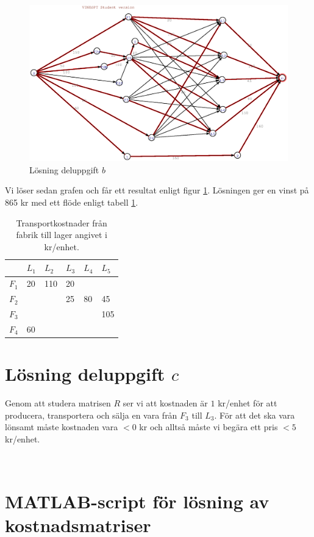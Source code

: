 \documentclass[titlepage, a4paper]{article}
\begin{document}
\begin{figure}[h!]
\centerline{\includegraphics[scale=0.65]{laborationsuppgift_13b_solved.ps}}
\caption{Lösning deluppgift $b$} \label{uppgiftb-graf}
\end{figure}

Vi löser sedan grafen och får ett resultat enligt figur \ref{uppgiftb-graf}. Lösningen ger en vinst på 865 kr med ett flöde enligt tabell \ref{uppgiftb-flode}.

\begin{table}[h!]
    \centering
    \begin{tabular}{ | l | l | l | l | l | l | }
        \hline
        {} & {$L_{1}$} & {$L_{2}$} & {$L_{3}$} & {$L_{4}$} & {$L_{5}$} \\\hline
        {$F_{1}$} & {20} & {110} & {20} & {} & {} \\\hline
        {$F_{2}$} & {} & {} & {25} & {80} & {45} \\\hline
        {$F_{3}$} & {} & {} & {} & {} & {105} \\\hline
        {$F_{4}$} & {60} & {} & {} & {} & {} \\\hline
    \end{tabular}
    \caption{Transportkostnader från fabrik till lager angivet i kr/enhet.} \label{uppgiftb-flode}
\end{table}

\section{Lösning deluppgift $c$}

Genom att studera matrisen $R$ ser vi att kostnaden är $1$ kr/enhet för att producera, transportera och sälja en vara från $F_{3}$ till $L_{3}$. För att det ska vara lönsamt måste kostnaden vara $<0$ kr och alltså måste vi begära ett pris $<5$ kr/enhet.

\newpage
\begin{appendices}
{\ }\vspace{1mm}
\section{MATLAB-script för lösning av kostnadsmatriser}

\end{appendices}
\end{document}
